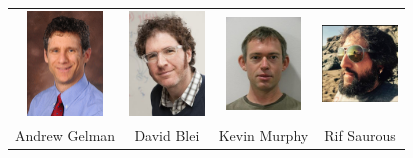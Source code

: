 \documentclass[10pt,
               xcolor={usenames,dvipsnames},
               hyperref={colorlinks,linktoc=all,citecolor=Plum,linkcolor=MidnightBlue,urlcolor=MidnightBlue},noamssymb]{beamer}
\begin{document}
\begin{frame}[plain]
\begin{center}
\vspace{-2ex}

\begin{tabular}{cccc}
\includegraphics[width=20mm]{img/gelman.png} &
\includegraphics[width=20mm]{img/blei.jpg} &
\includegraphics[width=20mm]{img/kevin.jpg} &
\includegraphics[width=20mm]{img/rif.png}\\
Andrew Gelman & David Blei & Kevin Murphy & Rif Saurous\\
\end{tabular}
\end{center}
\end{frame}

\end{document}
